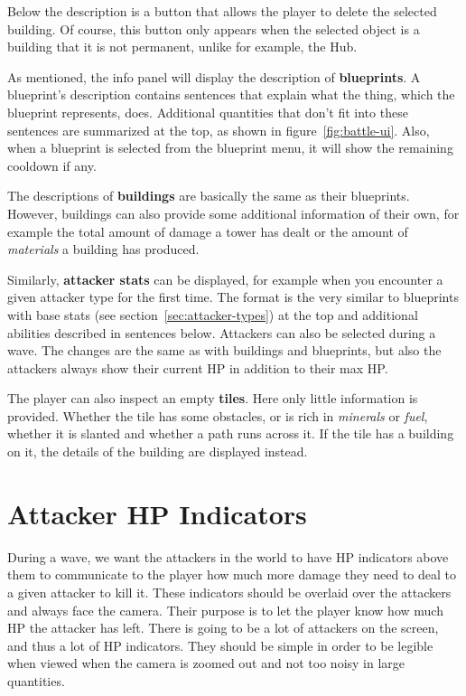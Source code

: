 Below the description is a button that allows the player to delete the selected building.
Of course, this button only appears when the selected object is a building that it is not permanent, unlike for example, the Hub.

As mentioned, the info panel will display the description of \textbf{blueprints}.
A blueprint's description contains sentences that explain what the thing, which the blueprint represents, does.
Additional quantities that don't fit into these sentences are summarized at the top, as shown in figure~\ref{fig:battle-ui}.
Also, when a blueprint is selected from the blueprint menu, it will show the remaining cooldown if any.

The descriptions of \textbf{buildings} are basically the same as their blueprints.
However, buildings can also provide some additional information of their own, for example the total amount of damage a tower has dealt or the amount of \emph{materials} a building has produced.

Similarly, \textbf{attacker stats} can be displayed, for example when you encounter a given attacker type for the first time.
The format is the very similar to blueprints with base stats (see section~\ref{sec:attacker-types}) at the top and additional abilities described in sentences below.
Attackers can also be selected during a wave.
The changes are the same as with buildings and blueprints, but also the attackers always show their current HP in addition to their max HP.

The player can also inspect an empty \textbf{tiles}.
Here only little information is provided.
Whether the tile has some obstacles, or is rich in \emph{minerals} or \emph{fuel}, whether it is slanted and whether a path runs across it.
If the tile has a building on it, the details of the building are displayed instead.

\section{Attacker HP Indicators}

During a wave, we want the attackers in the world to have HP indicators above them to communicate to the player how much more damage they need to deal to a given attacker to kill it.
These indicators should be overlaid over the attackers and always face the camera.
Their purpose is to let the player know how much HP the attacker has left.
There is going to be a lot of attackers on the screen, and thus a lot of HP indicators.
They should be simple in order to be legible when viewed when the camera is zoomed out and not too noisy in large quantities.

